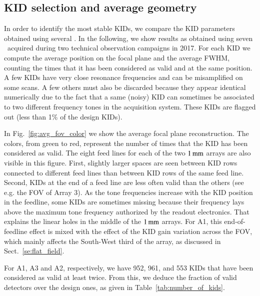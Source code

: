 \subsection{KID selection and average geometry}
\label{se:avg_kidpar}

In order to identify the most stable KIDs, we compare the KID parameters
obtained using several \bms.  In the following, we show results as
obtained using seven \bms\ acquired during two technical observation
campaigns in 2017.
For each KID we
compute the average position on the focal plane and the average FWHM, counting
the times that it has been considered as valid and at the same position. 
A few KIDs have very close resonance frequencies and can be misamplified on some scans. A
few others must also be discarded because they appear identical numerically due
to the fact that a same (noisy) KID can sometimes be associated
to two different frequency tones in the acquisition system.
These KIDs are flagged out (less than 1\% of the design KIDs).

In Fig.~\ref{fig:avg_fov_color} we show the
average focal plane reconstruction. The colors, from green to red,
represent the number of times that the KID has been considered as valid.
The eight feed lines for each of the two
$1\,\rm{mm}$ arrays are also visible in this figure. First, slightly
larger spaces are seen between KID rows connected to different
feed lines than between KID rows of the same feed line. Second,
KIDs at the end of a feed line are less often valid than the others
(see e.g. the FOV of Array 3). As the tone frequencies
increase with the KID position in the feedline, some KIDs are
sometimes missing because their frequency lays above the maximum tone
frequency authorized by the readout electronics. That explains the linear holes
in the middle of the $1\,\rm{mm}$ arrays. For A1, this end-of-feedline
effect is mixed with the effect of the KID gain variation across the
FOV, which mainly affects the South-West third of the array, as
discussed in Sect.~\ref{se:flat_field}.

For A1, A3 and A2, respectively, we have 952, 961, and 553 KIDs that
have been considered as valid at least twice. From this, we deduce the fraction of
valid detectors over the design ones, as given in Table~\ref{tab:number_of_kids}.


